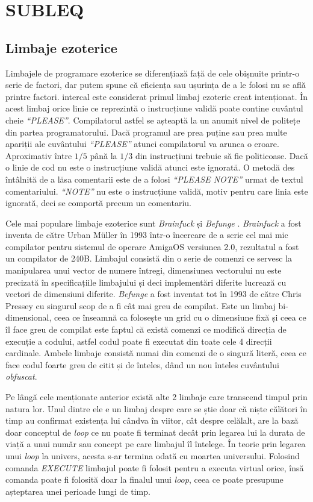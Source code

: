 \documentclass[../main.tex]{subfiles}
\begin{document}
\section{SUBLEQ}
\subsection{Limbaje ezoterice}
Limbajele de programare ezoterice se diferențiază față de cele obișnuite printr-o serie de factori, dar putem
spune că eficiența sau ușurința de a le folosi nu se află printre factori. \acrshort{intercal} \cite{intercal} 
este considerat primul limbaj ezoteric creat intenționat. În acest limbaj orice linie ce reprezintă o instrucțiune
validă poate contine cuvântul cheie \emph{``PLEASE''}. Compilatorul astfel se așteaptă la un anumit nivel de politețe
din partea programatorului. Dacă programul are prea puține sau prea multe apariții ale cuvântului \emph{``PLEASE''}
atunci compilatorul va arunca o eroare. Aproximativ între $1/5$ până la $1/3$ din instrucțiuni trebuie să fie
politicoase. Dacă o linie de cod nu este o instrucțiune validă atunci este ignorată. O metodă des întâlnită de a
lăsa comentarii este de a folosi \emph{``PLEASE NOTE''} urmat de textul comentariului. \emph{``NOTE''} nu este
o instrucțiune validă, motiv pentru care linia este ignorată, deci se comportă precum un comentariu.

Cele mai populare limbaje ezoterice sunt \emph{Brainfuck} \cite{brainfuck} și \emph{Befunge} \cite{befunge}.
\emph{Brainfuck} \cite{brainfuck} a fost inventa de către Urban Müller în 1993 într-o încercare de a scrie cel mai mic 
compilator pentru sistemul de operare AmigaOS versiunea 2.0, rezultatul a fost un compilator de 240B. Limbajul
consistă din o serie de comenzi ce servesc la manipularea unui vector de numere întregi, dimensiunea vectorului
nu este precizată în specificațiile limbajului și deci implementări diferite lucrează cu vectori de dimensiuni
diferite. \emph{Befunge} \cite{befunge} a fost inventat tot în 1993 de către Chris Pressey cu singurul scop de
a fi cât mai greu de compilat. Este un limbaj bi-dimensional, ceea ce înseamnă ca folosește un grid cu o dimensiune
fixă și ceea ce îl face greu de compilat este faptul că există comenzi ce modifică direcția de execuție a codului,
astfel codul poate fi executat din toate cele 4 direcții cardinale. Ambele limbaje consistă numai din comenzi de o 
singură literă, ceea ce face codul foarte greu de citit și de înteles, dând un nou înteles cuvântului \emph{obfuscat}.

Pe lângă cele menționate anterior există alte 2 limbaje care transcend timpul prin natura lor. Unul dintre ele
e un limbaj despre care se știe doar că niște călători în timp au confirmat existența lui cândva în viitor, cât
despre celălalt, are la bază doar conceptul de \emph{loop} ce nu poate fi terminat decât prin legarea lui la
durata de viață a unui număr sau concept pe care limbajul îl întelege. În teorie prin legarea unui \emph{loop} la univers,
acesta s-ar termina odată cu moartea universului. Folosind comanda \emph{EXECUTE} limbajul poate fi folosit pentru a
executa virtual orice, însă comanda poate fi folosită doar la finalul unui \emph{loop}, ceea ce poate presupune
așteptarea unei perioade lungi de timp.
\end{document}
